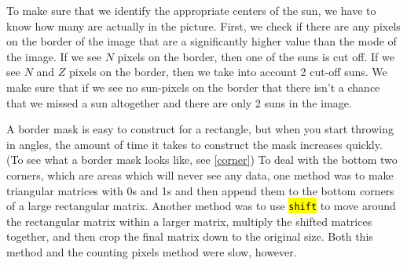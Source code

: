 \documentclass[10pt]{scrartcl}
\begin{document}
To make sure that we identify the appropriate centers of the sun, we have to know how many are actually in the picture. First, we check if there are any pixels on the border of the image that are a significantly higher value than the mode of the image. If we see $N$ pixels on the border, then one of the suns is cut off. If we see $N$ and $Z$ pixels on the border, then we take into account 2 cut-off suns. We make sure that if we see no sun-pixels on the border that there isn't a chance that we missed a sun altogether and there are only 2 suns in the image. 

\begin{figure}[!ht]
\end{figure}

A border mask is easy to construct for a rectangle, but when you start throwing in angles, the amount of time it takes to construct the mask increases quickly. (To see what a border mask looks like, see \cref{corner}) To deal with the bottom two corners, which are areas which will never see any data, one method was to make triangular matrices with 0s and 1s and then append them to the bottom corners of a large rectangular matrix. Another method was to use \hl{\texttt{shift}} to move around the rectangular matrix within a larger matrix, multiply the shifted matrices together, and then crop the final matrix down to the original size. Both this method and the counting pixels method were slow, however. \\
\end{document}
